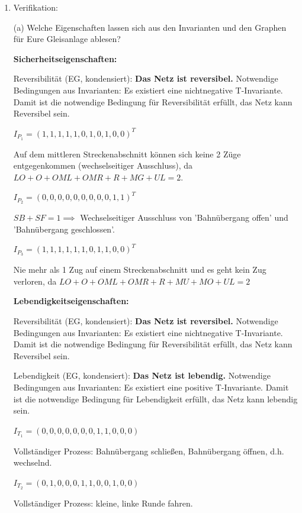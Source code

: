 \documentclass{scrreprt}
\begin{document}
\begin{enumerate}
\newpage

\item Verifikation:

(a) Welche Eigenschaften lassen sich aus den Invarianten und den Graphen für Eure Gleisanlage ablesen?

\textbf{Sicherheitseigenschaften:}


Reversibilität (EG, kondensiert):
\textbf{Das Netz ist reversibel.}
Notwendige Bedingungen aus Invarianten:
  Es existiert eine nichtnegative T-Invariante.
  Damit ist die notwendige Bedingung für Reversibilität erfüllt,
  das Netz kann Reversibel sein.

$I_{P_1} = (1, 1, 1, 1, 1, 0, 1, 0, 1, 0, 0)^T$

Auf dem mittleren Streckenabschnitt können sich keine 2 Züge entgegenkommen (wechselseitiger Ausschluss), da $LO + O + OML + OMR + R + MG + UL = 2$. 

$I_{P_2} = (0, 0, 0, 0, 0, 0, 0, 0, 0, 1, 1)^T$

$SB + SF = 1 \implies$ Wechselseitiger Ausschluss von 'Bahnübergang offen' und 'Bahnübergang geschlossen'.

$I_{P_3} = (1, 1, 1, 1, 1, 1, 0, 1, 1, 0, 0)^T$

Nie mehr als 1 Zug auf einem Streckenabschnitt und es geht kein Zug verloren, da $LO + O + OML + OMR + R + MU + MO + UL = 2$

\textbf{Lebendigkeitseigenschaften:}

Reversibilität (EG, kondensiert):
\textbf{Das Netz ist reversibel.}
Notwendige Bedingungen aus Invarianten:
  Es existiert eine nichtnegative T-Invariante.
  Damit ist die notwendige Bedingung für Reversibilität erfüllt,
  das Netz kann Reversibel sein.

Lebendigkeit (EG, kondensiert):
\textbf{Das Netz ist lebendig.}
Notwendige Bedingungen aus Invarianten:
  Es existiert eine positive T-Invariante.
  Damit ist die notwendige Bedingung für Lebendigkeit erfüllt,
  das Netz kann lebendig sein.


$I_{T_1} = (0, 0, 0, 0, 0, 0, 0, 1, 1, 0, 0, 0)$

Vollständiger Prozess: Bahnübergang schließen, Bahnübergang öffnen, d.h. wechselnd.

$I_{T_2} = (0, 1, 0, 0, 0, 1, 1, 0, 0, 1, 0, 0)$

Vollständiger Prozess: kleine, linke Runde fahren.


\end{enumerate}
\end{document}
